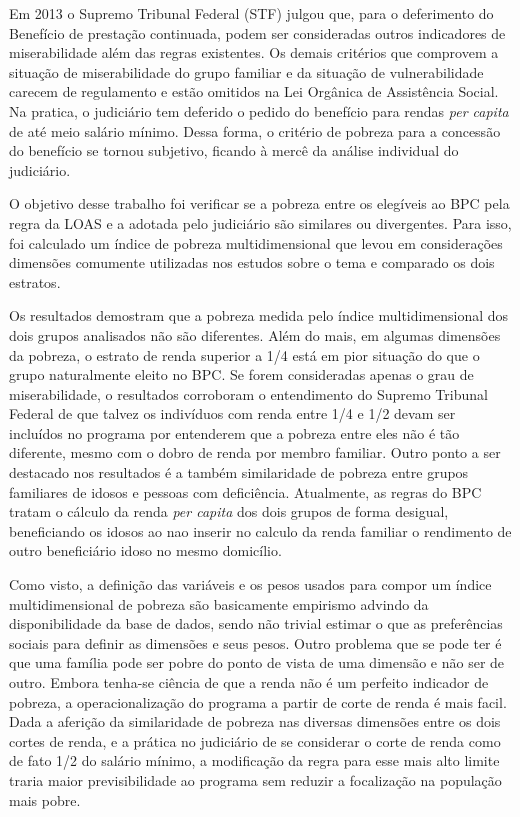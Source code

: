 \documentclass[
	12pt,				%
	openright,			%
	twoside,			%
	a4paper,			%
	english,			%
	french,				%
	spanish,			%
	brazil				%
	]{abntex2}
\begin{document}
Em 2013 o Supremo Tribunal Federal (STF) julgou que, para o deferimento do
Benefício de prestação continuada, podem ser consideradas outros indicadores de miserabilidade além das regras existentes. Os demais critérios que comprovem a situação de miserabilidade do grupo familiar e da situação de vulnerabilidade carecem de regulamento e estão omitidos na Lei Orgânica de Assistência Social. Na pratica, o judiciário tem deferido o pedido do benefício para rendas \textit{per capita} de até meio salário mínimo. Dessa forma, o critério de pobreza para a concessão do benefício se tornou subjetivo, ficando à mercê da análise individual do judiciário.

O objetivo desse trabalho foi verificar se a pobreza entre os elegíveis ao BPC pela regra da LOAS e a adotada pelo judiciário são similares ou divergentes. Para isso, foi calculado um índice de pobreza multidimensional que levou em considerações dimensões comumente utilizadas nos estudos sobre o tema e comparado os dois estratos. 

Os resultados demostram que a pobreza medida pelo índice multidimensional dos dois grupos analisados não são diferentes. Além do mais, em algumas dimensões da pobreza, o estrato de renda superior a 1/4 está em pior situação do que o grupo naturalmente eleito no BPC. Se forem consideradas apenas o grau de miserabilidade, o resultados corroboram o entendimento do Supremo Tribunal Federal de que talvez os indivíduos com renda entre 1/4 e 1/2 devam ser incluídos no programa por entenderem que a pobreza entre eles não é tão diferente, mesmo com o dobro de renda por membro familiar. Outro ponto a ser destacado nos resultados é a também similaridade de pobreza entre grupos familiares de idosos e pessoas com deficiência. Atualmente, as regras do BPC tratam o cálculo da renda \textit{per capita} dos dois grupos de forma desigual, beneficiando os idosos ao nao inserir no calculo da renda familiar o rendimento de outro beneficiário idoso no mesmo domicílio. 

Como visto, a definição das variáveis e os pesos usados para compor um índice multidimensional de pobreza são basicamente empirismo advindo da disponibilidade da base de dados, sendo não trivial estimar o que as preferências sociais para definir as dimensões e seus pesos. Outro problema que se pode ter é que uma família pode ser pobre do ponto de vista de uma dimensão e não ser de outro. Embora tenha-se ciência de que a renda não é um perfeito indicador de pobreza, a operacionalização do programa a partir de corte de renda é mais facil. Dada a aferição da similaridade de pobreza nas diversas dimensões entre os dois cortes de renda, e a prática no judiciário de se considerar o corte de renda como de fato 1/2 do salário mínimo, a modificação da regra para esse mais alto limite traria maior previsibilidade ao programa sem reduzir a focalização na população mais pobre. 
\end{document}
